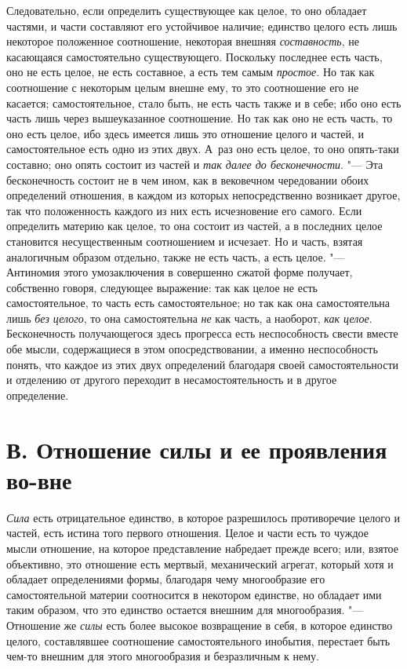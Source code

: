 Следовательно, если определить существующее как целое, то оно обладает
частями, и части составляют его устойчивое наличие; единство целого есть
лишь некоторое положенное соотношение, некоторая внешняя
{\em составность}, не касающаяся самостоятельно
существующего. Поскольку последнее есть часть, оно не есть целое, не есть
составное, а есть тем самым {\em простое}. Но так как
соотношение с некоторым целым внешне ему, то это соотношение его не
касается; самостоятельное, стало быть, не есть часть также и в себе; ибо
оно есть часть лишь через вышеуказанное соотношение. Но так как оно не есть
часть, то оно есть целое, ибо здесь имеется лишь это отношение целого и
частей, и самостоятельное есть одно из этих двух. А~раз оно есть целое,
то оно опять-таки составно; оно опять состоит из частей и
{\em так далее до бесконечности}. "--- Эта бесконечность
состоит не в чем ином, как в вековечном чередовании обоих определений
отношения, в каждом из которых непосредственно возникает другое, так что
положенность каждого из них есть исчезновение его самого. Если определить
материю как целое, то она состоит из частей, а в последних целое становится
несущественным соотношением и исчезает. Но и часть, взятая аналогичным
образом отдельно, также не есть часть, а есть целое. "--- Антиномия этого
умозаключения в совершенно сжатой форме получает, собственно говоря,
следующее выражение: так как целое не есть самостоятельное, то часть есть
самостоятельное; но так как она самостоятельна лишь
{\em без целого}, то она самостоятельна
{\em не} как часть, а наоборот,
{\em как целое}. Бесконечность получающегося здесь
прогресса есть неспособность свести вместе обе мысли, содержащиеся в этом
опосредствовании, а именно неспособность понять, что каждое из этих двух
определений благодаря своей самостоятельности и отделению от другого
переходит в несамостоятельность и в другое определение.


\section[В. Отношение силы и ее проявления во-вне]
{В. Отношение силы и ее проявления во-вне}

{\em Сила} есть
отрицательное единство, в которое разрешилось противоречие целого и частей,
есть истина того первого отношения. Целое и части есть то чуждое мысли
отношение, на которое представление набредает прежде всего; или, взятое
объективно, это отношение есть мертвый, механический агрегат, который хотя
и обладает определениями формы, благодаря чему многообразие его
самостоятельной материи соотносится в некотором единстве, но обладает ими
таким образом, что это единство остается внешним для многообразия. "---
Отношение же {\em силы} есть более высокое возвращение
в себя, в которое единство целого, составлявшее соотношение
самостоятельного инобытия, перестает быть чем-то внешним для этого
многообразия и безразличным к нему.

